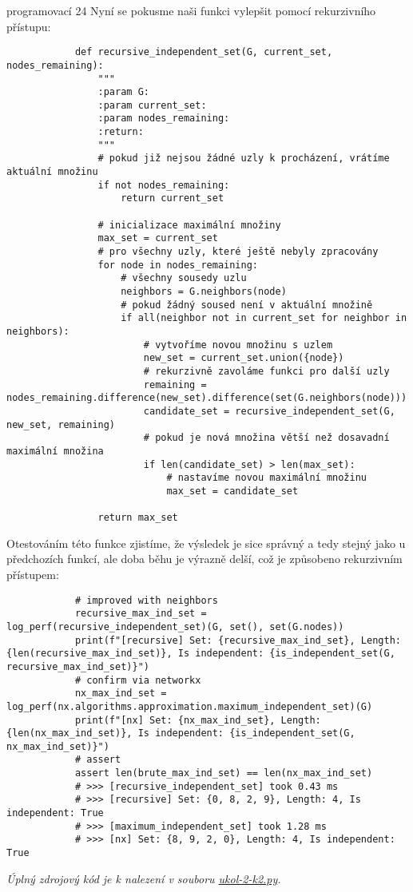 \documentclass[10pt, a4paper]{ReportSheet}
\begin{document}
\begin{uloha}{programovací 2}{4}
        Nyní se pokusme naši funkci vylepšit pomocí rekurzivního přístupu:
        \begin{verbatim}
            def recursive_independent_set(G, current_set, nodes_remaining):
                """
                :param G:
                :param current_set:
                :param nodes_remaining:
                :return:
                """
                # pokud již nejsou žádné uzly k procházení, vrátíme aktuální množinu
                if not nodes_remaining:
                    return current_set

                # inicializace maximální množiny
                max_set = current_set
                # pro všechny uzly, které ještě nebyly zpracovány
                for node in nodes_remaining:
                    # všechny sousedy uzlu
                    neighbors = G.neighbors(node)
                    # pokud žádný soused není v aktuální množině
                    if all(neighbor not in current_set for neighbor in neighbors):
                        # vytvoříme novou množinu s uzlem
                        new_set = current_set.union({node})
                        # rekurzivně zavoláme funkci pro další uzly
                        remaining = nodes_remaining.difference(new_set).difference(set(G.neighbors(node)))
                        candidate_set = recursive_independent_set(G, new_set, remaining)
                        # pokud je nová množina větší než dosavadní maximální množina
                        if len(candidate_set) > len(max_set):
                            # nastavíme novou maximální množinu
                            max_set = candidate_set

                return max_set
        \end{verbatim}

        \clearpage
        Otestováním této funkce zjistíme, že výsledek je sice správný a tedy stejný jako u předchozích funkcí, ale doba
        běhu je výrazně delší, což je způsobeno rekurzivním přístupem:
        \begin{verbatim}
            # improved with neighbors
            recursive_max_ind_set = log_perf(recursive_independent_set)(G, set(), set(G.nodes))
            print(f"[recursive] Set: {recursive_max_ind_set}, Length: {len(recursive_max_ind_set)}, Is independent: {is_independent_set(G, recursive_max_ind_set)}")
            # confirm via networkx
            nx_max_ind_set = log_perf(nx.algorithms.approximation.maximum_independent_set)(G)
            print(f"[nx] Set: {nx_max_ind_set}, Length: {len(nx_max_ind_set)}, Is independent: {is_independent_set(G, nx_max_ind_set)}")
            # assert
            assert len(brute_max_ind_set) == len(nx_max_ind_set)
            # >>> [recursive_independent_set] took 0.43 ms
            # >>> [recursive] Set: {0, 8, 2, 9}, Length: 4, Is independent: True
            # >>> [maximum_independent_set] took 1.28 ms
            # >>> [nx] Set: {8, 9, 2, 0}, Length: 4, Is independent: True
        \end{verbatim}

        \textit{
            Úplný zdrojový kód je k nalezení v souboru \href{https://github.com/filipditrich/MMAD-2024/blob/main/ukol-2-k2.py}{ukol-2-k2.py}.
        }
    \end{uloha}
\end{document}
